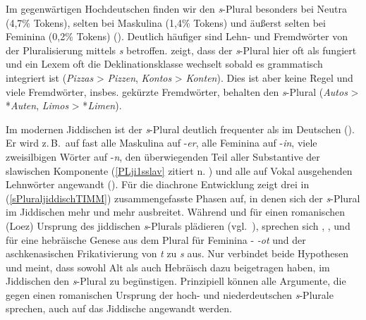 Im gegenwärtigen Hochdeutschen finden wir den \textit{s}-Plural besonders bei Neutra (4,7\% Tokens), selten bei Maskulina (1,4\% Tokens) und äußerst selten bei Feminina (0,2\% Tokens) (\citealt[45–48]{Pavlov1995}). Deutlich häufiger sind Lehn- und Fremdwörter von der Pluralisierung mittels \textit{s} betroffen. \citealt{Wegener2004} zeigt, dass der \textit{s}-Plural hier oft als  fungiert und ein Lexem oft die Deklinationsklasse wechselt sobald es grammatisch integriert ist  (\textit{Pizzas} > \textit{Pizzen}, \textit{Kontos} > \textit{Konten}). Dies ist aber keine Regel und viele Fremdwörter, insbes. gekürzte Fremdwörter, behalten den \textit{s}-Plural (\textit{Autos} > *\textit{Auten}, \textit{Limos} > *\textit{Limen}).
   
 Im modernen Jiddischen ist der \textit{s}-Plural deutlich frequenter als im Deutschen (\citealt{Timm2007}). Er wird z.\,B.\, auf fast alle Maskulina auf -\textit{er}, alle Feminina auf -\textit{in}, viele zweisilbigen Wörter auf -\textit{n}, den überwiegenden Teil aller Substantive der slawischen Komponente (\ref{PLji1sslav} zitiert n. \citealt[163]{Jacobs2005}) und alle auf Vokal ausgehenden Lehnwörter angewandt (\citealt{Timm2007}). Für die diachrone Entwicklung zeigt \cite{Timm2007} drei in (\ref{sPluraljiddischTIMM}) zusammengefasste Phasen auf, 
 in denen sich der \textit{s}-Plural im Jiddischen mehr und mehr ausbreitet. Während \cite[28, 115]{Bin-Nun1973} und \cite{Timm2007} für einen romanischen (Loez) Ursprung des jiddischen \textit{s}-Plurals plädieren (vgl.\, \citealt{Neuberg2007}), sprechen sich \cite[37]{Birnbaum1922}, \cite{King1990}, \cite[399]{Krogh2001} und \cite[402]{Jacobsetal2013} für eine hebräische Genese aus dem Plural für Feminina - \textit{-ot} und der aschkenasischen Frikativierung von {\hebr}  \textit{t} zu \textit{s} aus. Nur \cite[63–68]{Weinreich1973} verbindet beide Hypothesen und meint, dass sowohl Alt als auch Hebräisch dazu beigetragen haben, im Jiddischen den \textit{s}-Plural zu begünstigen. Prinzipiell können alle Argumente, die gegen einen romanischen Ursprung der hoch- und niederdeutschen \textit{s}-Plurale sprechen, auch auf das Jiddische angewandt werden. 
 
   \label{sPluraljiddischTIMM}
 

